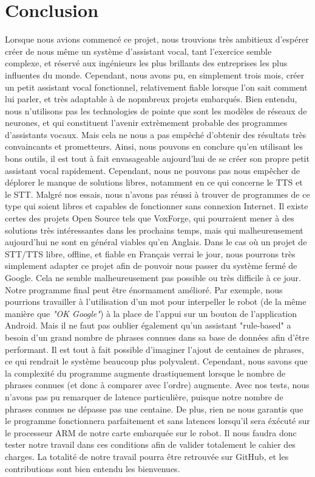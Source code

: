 \documentclass[a4paper,10pt]{report}
\begin{document}
    \chapter{Conclusion}
    {Lorsque nous avions commencé ce projet, nous trouvions très ambitieux d'espérer créer de nous même un système d'assistant vocal, tant l'exercice semble complexe, et réservé aux ingénieurs les plus brillants des entreprises les plus influentes du monde. Cependant, nous avons pu, en simplement trois mois, créer un petit assistant vocal fonctionnel, relativement fiable lorsque l'on sait comment lui parler, et très adaptable à de nopmbreux projets embarqués. Bien entendu, nous n'utilisons pas les technologies de pointe que sont les modèles de réseaux de neurones, et qui constituent l'avenir extrèmement probable des programmes d'assistants vocaux. Mais cela ne nous a pas empêché d'obtenir des résultats très convaincants et prometteurs. Ainsi, nous pouvons en conclure qu'en utilisant les bons outils, il est tout à fait envasageable aujourd'hui de se créer son propre petit assistant vocal rapidement.\newline}
    {Cependant, nous ne pouvons pas nous empêcher de déplorer le manque de solutions libres, notamment en ce qui concerne le TTS et le STT. Malgré nos essais, nous n'avons pas réussi à trouver de programmes de ce type qui soient libres et capables de fonctionner sans connexion Internet. Il existe certes des projets Open Source tels que VoxForge, qui pourraient mener à des solutions très intéressantes dans les prochains temps, mais qui malheureusement aujourd'hui ne sont en général viables qu'en Anglais.\newline}
    {Dans le cas où un projet de STT/TTS libre, offline, et fiable en Français verrai le jour, nous pourrons très simplement adapter ce projet afin de pouvoir nous passer du système fermé de Google. Cela ne semble malheureusement pas possible ou très difficile à ce jour.\newline}
    {Notre programme final peut être énormament amélioré. Par exemple, nous pourrions travailler à l'utilisation d'un mot pour interpeller le robot (de la même manière que \textit{"OK Google"}) à la place de l'appui sur un bouton de l'application Android. Mais il ne faut pas oublier également qu'un assistant "rule-based" a besoin d'un grand nombre de phrases connues dans sa base de données afin d'être performant. Il est tout à fait possible d'imaginer l'ajout de centaines de phrases, ce qui rendrait le système beaucoup plus polyvalent. Cependant, nous savons que la complexité du programme augmente drastiquement lorsque le nombre de phrases connues (et donc à comparer avec l'ordre) augmente. Avec nos tests, nous n'avons pas pu remarquer de latence particulière, puisque notre nombre de phrases connues ne dépasse pas une centaine. De plus, rien ne nous garantis que le programme fonctionnera parfaitement et sans latences lorsqu'il sera éxécuté sur le processeur ARM de notre carte embarquée sur le robot. Il nous faudra donc tester notre travail dans ces conditions afin de valider totalement le cahier des charges.\newline}
    {La totalité de notre travail pourra être retrouvée sur GitHub, et les contributions sont bien entendu les bienvenues.}
\end{document}
